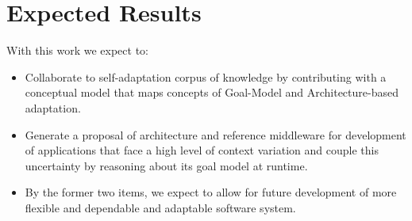 \section{Expected Results}

With this work we expect to:

\begin{itemize}
\item Collaborate to self-adaptation corpus of knowledge by contributing with a conceptual model that maps concepts of Goal-Model and Architecture-based adaptation.

\item Generate a proposal of architecture and reference middleware for development of applications that face a high level of context variation and couple this uncertainty by reasoning about its goal model at runtime.

\item By the former two items, we expect to allow for future development of more flexible and dependable and adaptable software system.

\end{itemize}
